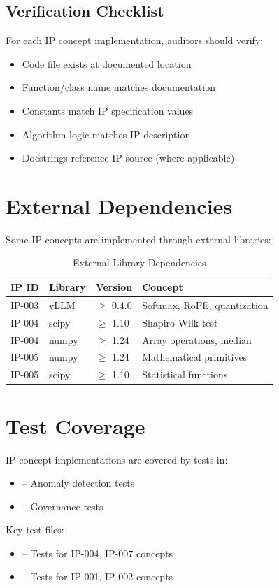 \subsection{Verification Checklist}

For each IP concept implementation, auditors should verify:

\begin{itemize}[nosep]
    \item[$\square$] Code file exists at documented location
    \item[$\square$] Function/class name matches documentation
    \item[$\square$] Constants match IP specification values
    \item[$\square$] Algorithm logic matches IP description
    \item[$\square$] Docstrings reference IP source (where applicable)
\end{itemize}

\section{External Dependencies}

Some IP concepts are implemented through external libraries:

\begin{table}[H]
\centering
\caption{External Library Dependencies}
\begin{tabularx}{\textwidth}{@{}lllX@{}}
\toprule
\textbf{IP ID} & \textbf{Library} & \textbf{Version} & \textbf{Concept} \\
\midrule
IP-003 & vLLM & $\geq$ 0.4.0 & Softmax, RoPE, quantization \\
IP-004 & scipy & $\geq$ 1.10 & Shapiro-Wilk test \\
IP-004 & numpy & $\geq$ 1.24 & Array operations, median \\
IP-005 & numpy & $\geq$ 1.24 & Mathematical primitives \\
IP-005 & scipy & $\geq$ 1.10 & Statistical functions \\
\bottomrule
\end{tabularx}
\end{table}

\section{Test Coverage}

IP concept implementations are covered by tests in:

\begin{itemize}[nosep]
    \item {} -- Anomaly detection tests
    \item {} -- Governance tests
\end{itemize}

Key test files:
\begin{itemize}[nosep]
    \item {} -- Tests for IP-004, IP-007 concepts
    \item {} -- Tests for IP-001, IP-002 concepts
\end{itemize}